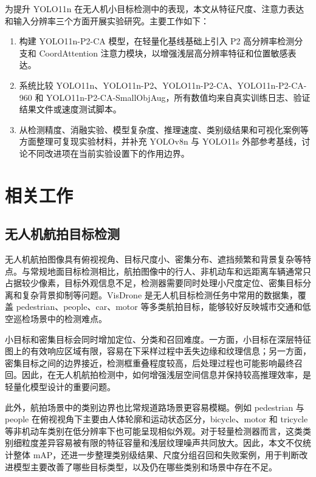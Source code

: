 \documentclass[UTF8,a4paper,10.5pt,fontset=windows]{ctexart}
\newcommand{\YOLOBase}{\mbox{YOLO11n}}
\newcommand{\YOLOPtwo}{\mbox{YOLO11n-P2}}
\newcommand{\YOLOPtwoCA}{\mbox{YOLO11n-P2-CA}}
\newcommand{\YOLOPtwoCANine}{\mbox{YOLO11n-P2-CA-960}}
\newcommand{\YOLOPtwoCASmall}{\mbox{YOLO11n-P2-CA-SmallObjAug}}
\newcommand{\YOLOEightN}{\mbox{YOLOv8n}}
\newcommand{\YOLOElevenS}{\mbox{YOLO11s}}
\newcommand{\CoordAtt}{\mbox{CoordAttention}}
\begin{document}
为提升 \YOLOBase{} 在无人机小目标检测中的表现，本文从特征尺度、注意力表达和输入分辨率三个方面开展实验研究。主要工作如下：

\begin{enumerate}
  \item 构建 \YOLOPtwoCA{} 模型，在轻量化基线基础上引入 P2 高分辨率检测分支和 \CoordAtt{} 注意力模块，以增强浅层高分辨率特征和位置敏感表达。
  \item 系统比较 \YOLOBase{}、\YOLOPtwo{}、\YOLOPtwoCA{}、\YOLOPtwoCANine{} 和 \YOLOPtwoCASmall{}，所有数值均来自真实训练日志、验证结果文件或速度测试脚本。
  \item 从检测精度、消融实验、模型复杂度、推理速度、类别级结果和可视化案例等方面整理可复现实验材料，并补充 \YOLOEightN{} 与 \YOLOElevenS{} 外部参考基线，讨论不同改进项在当前实验设置下的作用边界。
\end{enumerate}

\section{相关工作}

\subsection{无人机航拍目标检测}

无人机航拍图像具有俯视视角、目标尺度小、密集分布、遮挡频繁和背景复杂等特点。与常规地面目标检测相比，航拍图像中的行人、非机动车和远距离车辆通常只占据较少像素，目标外观信息不足，检测器需要同时处理小尺度定位、密集目标分离和复杂背景抑制等问题。VisDrone 是无人机目标检测任务中常用的数据集，覆盖 pedestrian、people、car、motor 等多类航拍目标，能够较好反映城市交通和低空巡检场景中的检测难点\cite{du2019visdrone,ultralytics_visdrone}。

小目标和密集目标会同时增加定位、分类和召回难度。一方面，小目标在深层特征图上的有效响应区域有限，容易在下采样过程中丢失边缘和纹理信息；另一方面，密集目标之间的边界接近，检测框重叠程度较高，后处理过程也可能影响最终召回。因此，在无人机航拍检测中，如何增强浅层空间信息并保持较高推理效率，是轻量化模型设计的重要问题。

此外，航拍场景中的类别边界也比常规道路场景更容易模糊。例如 pedestrian 与 people 在俯视视角下主要由人体轮廓和运动状态区分，bicycle、motor 和 tricycle 等非机动车类别在低分辨率下也可能呈现相似外观。对于轻量检测器而言，这类类别细粒度差异容易被有限的特征容量和浅层纹理噪声共同放大。因此，本文不仅统计整体 mAP，还进一步整理类别级结果、尺度分组召回和失败案例，用于判断改进模型主要改善了哪些目标类型，以及仍在哪些类别和场景中存在不足。
\end{document}
